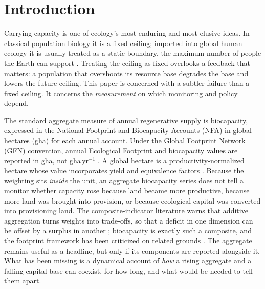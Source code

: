 \documentclass[preprint,12pt,authoryear]{elsarticle}
\begin{document}
\section{Introduction}\label{sec:intro}

Carrying capacity is one of ecology's most enduring and most elusive ideas. In classical population biology it is a fixed ceiling; imported into global human ecology it is usually treated as a static boundary, the maximum number of people the Earth can support \citep[cf.][]{Cohen1995}. Treating the ceiling as fixed overlooks a feedback that matters: a population that overshoots its resource base degrades the base and lowers the future ceiling. This paper is concerned with a subtler failure than a fixed ceiling. It concerns the \emph{measurement} on which monitoring and policy depend.

The standard aggregate measure of annual regenerative supply is biocapacity, expressed in the National Footprint and Biocapacity Accounts (NFA) in global hectares (gha) for each annual account. Under the Global Footprint Network (GFN) convention, annual Ecological Footprint and biocapacity values are reported in gha, not gha\,yr$^{-1}$ \citep{GFNStandards2009,GFNGuidebook2019}. A global hectare is a productivity-normalized hectare whose value incorporates yield and equivalence factors \citep{Borucke2013,Lin2018}. Because the weighting sits \emph{inside} the unit, an aggregate biocapacity series does not tell a monitor whether capacity rose because land became more productive, because more land was brought into provision, or because ecological capital was converted into provisioning land. The composite-indicator literature warns that additive aggregation turns weights into trade-offs, so that a deficit in one dimension can be offset by a surplus in another \citep{Nardo2008,Becker2017,Fischer2022}; biocapacity is exactly such a composite, and the footprint framework has been criticized on related grounds \citep{Blomqvist2013,GiampietroSaltelli2014,vdBerghGrazi2015,Galli2016}. The aggregate remains useful as a headline, but only if its components are reported alongside it. What has been missing is a dynamical account of \emph{how} a rising aggregate and a falling capital base can coexist, for how long, and what would be needed to tell them apart.
\end{document}
